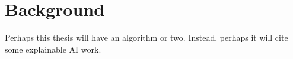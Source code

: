 \chapter{Background}

Perhaps this thesis will have an algorithm or two\cite{knuth-fa}. Instead,
perhaps it will cite some explainable AI work\cite{whitten2024naecon}.

\lipsum[1-2]
